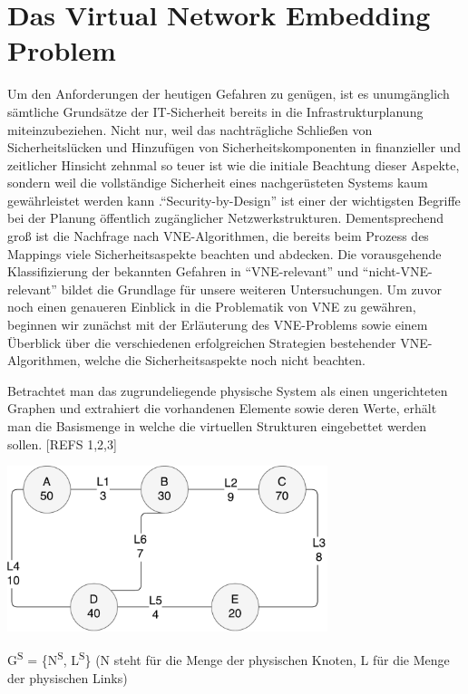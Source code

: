\documentclass{lni}
\begin{document}
\section{Das Virtual Network Embedding Problem}
\label{sec:VNE-Problem}
Um den Anforderungen der heutigen Gefahren zu genügen, ist es unumgänglich sämtliche Grundsätze der IT-Sicherheit bereits in die Infrastrukturplanung miteinzubeziehen. Nicht nur, weil das nachträgliche Schließen von Sicherheitslücken und Hinzufügen von Sicherheitskomponenten in finanzieller und zeitlicher Hinsicht zehnmal so teuer ist wie die initiale Beachtung dieser Aspekte, sondern weil die vollständige Sicherheit eines nachgerüsteten Systems kaum gewährleistet werden kann \cite{Cole}."`Security-by-Design"' ist einer der wichtigsten Begriffe bei der Planung öffentlich zugänglicher Netzwerkstrukturen. Dementsprechend groß ist die Nachfrage nach VNE-Algorithmen, die bereits beim Prozess des Mappings viele Sicherheitsaspekte beachten und abdecken. Die vorausgehende Klassifizierung der bekannten Gefahren in "`VNE-relevant"' und "`nicht-VNE-relevant"' bildet die Grundlage für unsere weiteren Untersuchungen. Um zuvor noch einen genaueren Einblick in die Problematik von VNE zu gewähren, beginnen wir zunächst mit der Erläuterung des VNE-Problems sowie einem Überblick über die verschiedenen erfolgreichen Strategien bestehender VNE-Algorithmen, welche die Sicherheitsaspekte noch nicht beachten. 

Betrachtet man das zugrundeliegende physische System als einen ungerichteten Graphen und extrahiert die vorhandenen Elemente sowie deren Werte, erhält man die Basismenge in welche die virtuellen Strukturen eingebettet werden sollen. [REFS 1,2,3]


\begin{center}
	\includegraphics[width=0.7\textwidth]{physical_structure2.pdf}\newline
\end{center}

\begin{center}
G\textsuperscript{S} = \{N\textsuperscript{S}, L\textsuperscript{S}\}\newline
(N steht für die Menge der physischen Knoten, L für die Menge der physischen Links)
\end{center}
\end{document}
